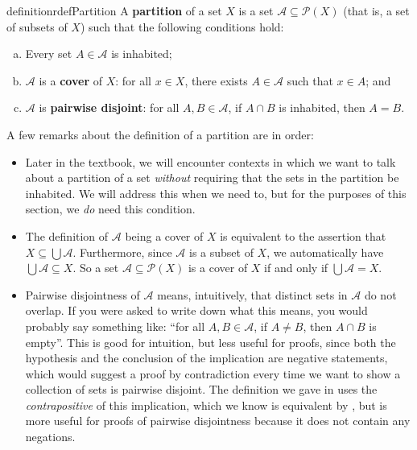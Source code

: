 \begin{restatable}{definition}{rdefPartition}
\label{defPartition}
A \textbf{partition} of a set $X$ is a set $\mathcal{A} \subseteq \mathcal{P}(X)$ (that is, a set of subsets of $X$) such that the following conditions hold:
\begin{enumerate}[(a)]
\item Every set $A \in \mathcal{A}$ is inhabited;
\item $\mathcal{A}$ is a \textbf{cover} of $X$: for all $x \in X$, there exists $A \in \mathcal{A}$ such that $x \in A$; and
\item $\mathcal{A}$ is \textbf{pairwise disjoint}: for all $A,B \in \mathcal{A}$, if $A \cap B$ is inhabited, then $A=B$.
\end{enumerate}
\end{restatable}

A few remarks about the definition of a partition are in order:
\begin{itemize}
\item Later in the textbook, we will encounter contexts in which we want to talk about a partition of a set \textit{without} requiring that the sets in the partition be inhabited. We will address this when we need to, but for the purposes of this section, we \textit{do} need this condition.
\item The definition of $\mathcal{A}$ being a cover of $X$ is equivalent to the assertion that $X \subseteq \bigcup \mathcal{A}$. Furthermore, since $\mathcal{A}$ is a subset of $X$, we automatically have $\bigcup \mathcal{A} \subseteq X$. So a set $\mathcal{A} \subseteq \mathcal{P}(X)$ is a cover of $X$ if and only if $\bigcup \mathcal{A} = X$.
\item Pairwise disjointness of $\mathcal{A}$ means, intuitively, that distinct sets in $\mathcal{A}$ do not overlap. If you were asked to write down what this means, you would probably say something like: ``for all $A, B \in \mathcal{A}$, if $A \ne B$, then $A \cap B$ is empty''. This is good for intuition, but less useful for proofs, since both the hypothesis and the conclusion of the implication are negative statements, which would suggest a proof by contradiction every time we want to show a collection of sets is pairwise disjoint. The definition we gave in  uses the \textit{contrapositive} of this implication, which we know is equivalent by , but is more useful for proofs of pairwise disjointness because it does not contain any negations.
\end{itemize}

